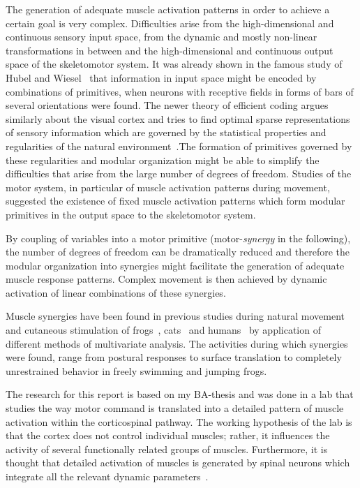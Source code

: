 \documentclass[]{article}
\begin{document}
The generation of adequate muscle activation patterns in order to achieve a certain goal is very complex. Difficulties arise from the high-dimensional and continuous sensory input space, from the dynamic and mostly non-linear transformations in between and the high-dimensional and continuous output space of the skeletomotor system. It was already shown in the famous study of Hubel and Wiesel~\cite{Hubel:1959p3833} that information in input space might be encoded by combinations of primitives, when neurons with receptive fields in forms of bars of several orientations were found. The newer theory of efficient coding argues similarly about the visual cortex and tries to find optimal sparse representations of sensory information which are governed by the statistical properties and regularities of the natural environment~\cite{Olshausen:1996p3611}.The formation of primitives governed by these regularities and modular organization might be able to simplify the difficulties that arise from the large number of degrees of freedom. Studies of the motor system, in particular of muscle activation patterns during movement, suggested the existence of fixed muscle activation patterns which form modular primitives in the output space to the skeletomotor system. 

By coupling of variables into a motor primitive (motor-\emph{synergy} in the following), the number of degrees of freedom can be dramatically reduced and therefore the modular organization into synergies might facilitate the generation of adequate muscle response patterns. Complex movement is then achieved by dynamic activation of linear combinations of these synergies.

Muscle synergies have been found in previous studies during natural movement and cutaneous stimulation of frogs~\cite{Tresch:1999p3783,Hart:2004p3786,Davella:2003p3784,Cheung:2005p3778}, cats~\cite{Ting:2004p3785} and humans~\cite{Merkle:1998p3780,Weiss:2004p3782,Krishnamoorthy:2003p3787,Olree:1995p3781,Ivanenko:2003p3779} by application of different methods of multivariate analysis. The activities during which synergies were found, range from postural responses to surface translation to completely unrestrained behavior in freely swimming and jumping frogs.

The research for this report is based on my BA-thesis and was done in a lab that studies the way motor command is translated into a detailed pattern of muscle activation within the corticospinal pathway. The working hypothesis of the lab is that the cortex does not control individual muscles; rather, it influences the activity of several functionally related groups of muscles. Furthermore, it is thought that detailed activation of muscles is generated by spinal neurons which integrate all the relevant dynamic parameters~\cite{yifat}.
\end{document}
